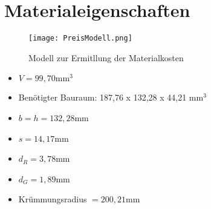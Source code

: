 \chapter{Materialeigenschaften}

\begin{figure}[h]
	\centering
	\texttt{[image: PreisModell.png]}
	\caption{Modell zur Ermitllung der Materialkosten}
	\label{abb_100mmModel}
\end{figure}
\begin{itemize}
		\item $V = 99,70\mathrm{mm}^3$
		\item Benötigter Bauraum: 187,76 x 132,28 x 44,21 mm$^3$
		\item $b = h = 132,28$mm
		\item $s = 14,17$mm
		\item $d_R = 3,78$mm
		\item $d_G = 1,89$mm
		\item Krümmungsradius $=200,21$mm
\end{itemize}
